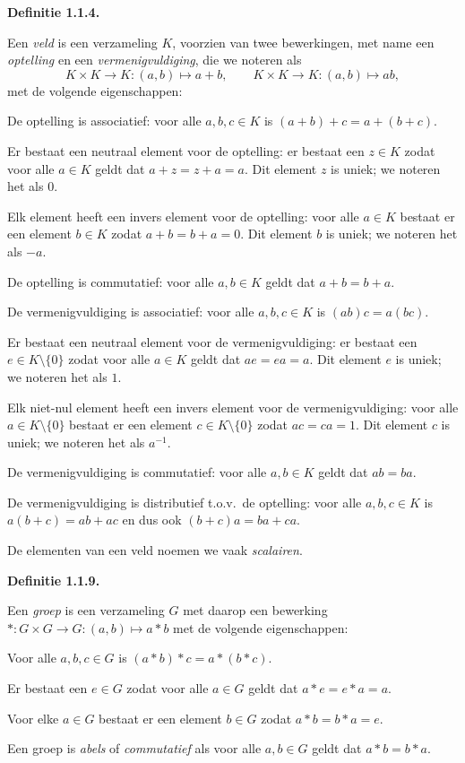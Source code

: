 \documentclass[10pt,a4paper]{article}
\newenvironment{res}[1]{%
  \par\noindent\textbf{Definitie #1.}~\ignorespaces
}{%
  \par\vspace{2pt}\normalfont
}
\begin{document}
\begin{res}{1.1.4}
Een \textit{veld} is een verzameling $K$, voorzien van twee bewerkingen, met name een \textit{optelling} en een \textit{vermenigvuldiging}, die we noteren als
\[
K\times K\to K:(a,b)\mapsto a+b,\qquad K\times K\to K:(a,b)\mapsto ab,
\]
met de volgende eigenschappen:
\begin{description}[leftmargin=2.6em,itemsep=1pt,topsep=1pt,font=\normalfont\bfseries]
\item[(K1)] De optelling is associatief: voor alle $a,b,c\in K$ is $(a+b)+c=a+(b+c)$.
\item[(K2)] Er bestaat een neutraal element voor de optelling: er bestaat een $z\in K$ zodat voor alle $a\in K$ geldt dat $a+z=z+a=a$. Dit element $z$ is uniek; we noteren het als $0$.
\item[(K3)] Elk element heeft een invers element voor de optelling: voor alle $a\in K$ bestaat er een element $b\in K$ zodat $a+b=b+a=0$. Dit element $b$ is uniek; we noteren het als $-a$.
\item[(K4)] De optelling is commutatief: voor alle $a,b\in K$ geldt dat $a+b=b+a$.
\item[(K5)] De vermenigvuldiging is associatief: voor alle $a,b,c\in K$ is $(ab)c=a(bc)$.
\item[(K6)] Er bestaat een neutraal element voor de vermenigvuldiging: er bestaat een $e\in K\setminus\{0\}$ zodat voor alle $a\in K$ geldt dat $ae=ea=a$. Dit element $e$ is uniek; we noteren het als $1$.
\item[(K7)] Elk niet-nul element heeft een invers element voor de vermenigvuldiging: voor alle $a\in K\setminus\{0\}$ bestaat er een element $c\in K\setminus\{0\}$ zodat $ac=ca=1$. Dit element $c$ is uniek; we noteren het als $a^{-1}$.
\item[(K8)] De vermenigvuldiging is commutatief: voor alle $a,b\in K$ geldt dat $ab=ba$.
\item[(K9)] De vermenigvuldiging is distributief t.o.v.\ de optelling: voor alle $a,b,c\in K$ is $a(b+c)=ab+ac$ en dus ook $(b+c)a=ba+ca$.
\end{description}
De elementen van een veld noemen we vaak \textit{scalairen}.
\end{res}

\begin{res}{1.1.9}
Een \textit{groep} is een verzameling $G$ met daarop een bewerking $*:G\times G\to G:(a,b)\mapsto a*b$ met de volgende eigenschappen:
\begin{description}[leftmargin=2.6em,itemsep=1pt,topsep=1pt,font=\normalfont\bfseries]
\item[(G1)] Voor alle $a,b,c\in G$ is $(a*b)*c=a*(b*c)$.
\item[(G2)] Er bestaat een $e\in G$ zodat voor alle $a\in G$ geldt dat $a*e=e*a=a$.
\item[(G3)] Voor elke $a\in G$ bestaat er een element $b\in G$ zodat $a*b=b*a=e$.
\end{description}
Een groep is \textit{abels} of \textit{commutatief} als voor alle $a,b\in G$ geldt dat $a*b=b*a$.
\end{res}
\end{document}
